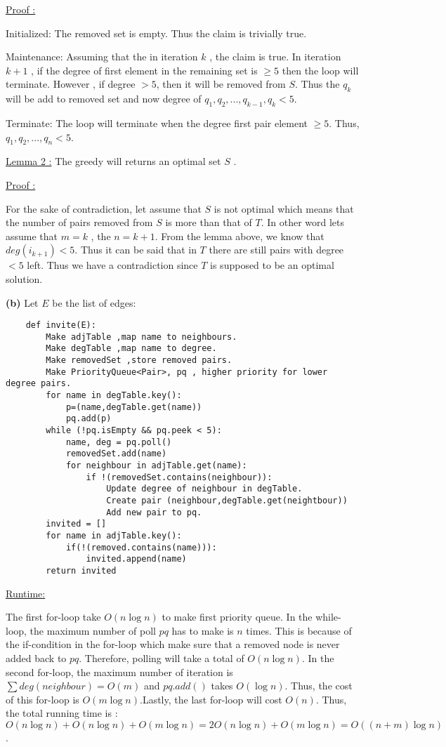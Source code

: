 \documentclass[a4paper, 12pt]{article}
\renewcommand{\part}[1] {\vspace{.10in} {\bf (#1)}}
\begin{document}
\underline{Proof :}

Initialized: The removed set is empty. Thus the claim is trivially true. 

Maintenance: Assuming that the in iteration $k$ , the claim is true. In iteration $k+1$ , if the degree of first element in the remaining set is $\geqslant 5$ then the loop will terminate. However , if degree $> 5$, then it will be removed from $S$. Thus the $q_k$ will be add to removed set and now degree of $q_1,q_2,...,q_{k-1},q_k < 5$. 

Terminate: The loop will terminate when the degree first pair element $\geqslant 5$. Thus, $q_1,q_2,...,q_n < 5$.


\underline{Lemma 2 :}
The greedy will returns an optimal set $S$ . 

\underline{Proof :}

For the sake of contradiction, let assume that $S$ is not optimal which means that the number of pairs removed from $S$ is more than that of $T$. In other word lets assume that $m = k$ , the $n = k+1$. From the lemma above, we know that $deg(i_{k+1}) < 5$. Thus it can be said that in $T$ there are still pairs with degree $< 5$ left. Thus we have a contradiction since $T$ is supposed to be an optimal solution.

\part{b} Let $E$ be the list of edges:
\begin{lstlisting}
	def invite(E):
		Make adjTable ,map name to neighbours.
		Make degTable ,map name to degree.
		Make removedSet ,store removed pairs.
		Make PriorityQueue<Pair>, pq , higher priority for lower degree pairs.
		for name in degTable.key():
			p=(name,degTable.get(name))
			pq.add(p)
		while (!pq.isEmpty && pq.peek < 5):
			name, deg = pq.poll()
			removedSet.add(name)
			for neighbour in adjTable.get(name):
				if !(removedSet.contains(neighbour)): 
					Update degree of neighbour in degTable.
					Create pair (neighbour,degTable.get(neightbour))
					Add new pair to pq.
		invited = []
		for name in adjTable.key():
			if(!(removed.contains(name))):
				invited.append(name)
		return invited
\end{lstlisting}
\underline{Runtime:}

The first for-loop take $O(n\log n)$ to make first priority queue. In the while-loop, the maximum number of poll $pq$ has to make is $n$ times. This is because of the if-condition in the for-loop which make sure that a removed node is never added back to $pq$. Therefore, polling will take a total of $O(n\log n)$. In the second for-loop, the maximum number of iteration is $\sum deg(neighbour) = O(m)$ and $pq.add()$ takes $O(\log n)$. Thus, the cost of this for-loop is $O(m\log n)$.Lastly, the last for-loop will cost $O(n)$. Thus, the total running time is : $O(n\log n) + O(n\log n) + O(m\log n ) = 2O(n\log n) + O(m \log n) = O((n+m)\log n)$.
\end{document}
